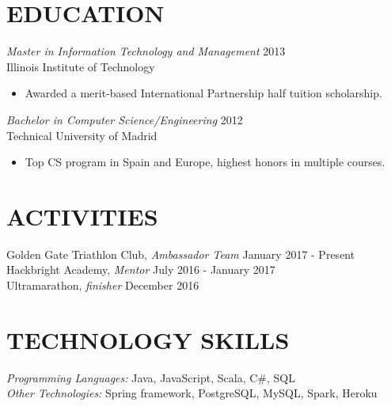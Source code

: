 \documentclass[overlapped, 10pt]{res} %
\begin{document}
\begin{resume}
 
\section{EDUCATION}\smallskip

{\sl Master in Information Technology and Management} \hfill 2013 \\
Illinois Institute of Technology
\begin{itemize}
\item Awarded a merit-based International Partnership half tuition scholarship.
\end{itemize} 

{\sl Bachelor in Computer Science/Engineering} \hfill 2012 \\
Technical University of Madrid
\begin{itemize} \itemsep -2pt %
\item Top CS program in Spain and Europe, highest honors in multiple courses.
\end{itemize}


\section{ACTIVITIES}\smallskip

Golden Gate Triathlon Club, {\sl Ambassador Team} \hfill January 2017 - Present\\
Hackbright Academy, {\sl Mentor} \hfill July 2016 - January 2017\\
Ultramarathon, {\sl finisher} \hfill December 2016 \\


\section{TECHNOLOGY SKILLS}\smallskip

{\sl Programming Languages:} Java, JavaScript, Scala, C\#, SQL \\
{\sl Other Technologies:} Spring framework, PostgreSQL, MySQL, Spark, Heroku \\
 

\end{resume}
\end{document}
